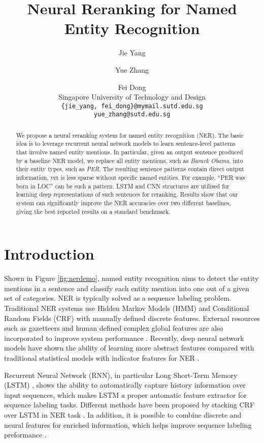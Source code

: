 \documentclass[11pt,a4paper]{article}
\title{Neural Reranking for Named Entity Recognition}
\author{Jie Yang \and Yue Zhang \and Fei Dong\\ 
  Singapore University of Technology and Design \\
  {\tt \{jie\_yang, fei\_dong\}@mymail.sutd.edu.sg} \\
  {\tt yue\_zhang@sutd.edu.sg} \\}
\date{}
\begin{document}
\maketitle
\begin{abstract}
  We propose a neural reranking system for named entity recognition (NER). The basic idea is to leverage recurrent neural network models to learn sentence-level patterns that involve named entity mentions. In particular, given an output sentence produced by a baseline NER model, we replace all entity mentions, such as \textit{Barack Obama}, into their entity types, such as \textit{PER}. The resulting sentence patterns contain direct output information, yet is less sparse without specific named entities. For example, ``PER was born in LOC'' can be such a pattern. LSTM and CNN structures are utilised for learning deep representations of such sentences for reranking. Results show that our system can significantly improve the NER accuracies over two different baselines, giving the best reported results on a standard benchmark.
\end{abstract}


\section{Introduction}

Shown in Figure \ref{fig:nerdemo}, named entity recognition aims to detect the entity mentions in a sentence and classify each entity mention into one out of a given set of categories. NER is typically solved as a sequence labeling problem. Traditional NER systems use Hidden Markov Models (HMM) \cite{zhou2002named} and Conditional Random Fields (CRF) \cite{lafferty2001conditional} with manually defined discrete features. External resources such as gazetteers and human defined complex global features are also incorporated to improve system performance \cite{ratinov2009design,che2013named}. Recently, deep neural network models have shown the ability of learning more abstract features compared with traditional statistical models with indicator features for NER \cite{zhang2015neural}.

Recurrent Neural Network (RNN), in particular Long Short-Term Memory (LSTM) \cite{hochreiter1997long}, shows the ability to automatically capture history information over input sequences, which makes LSTM a proper automatic feature extractor for sequence labeling tasks. Different methods have been proposed by stacking CRF over LSTM in NER task \cite{chiu2015named,huang2015bidirectional,lample2016neural,ma2016end}. In addition, it is possible to combine discrete and neural features for enriched information, which helps improve sequence labeling preformance \cite{zhang2016libn3l}.
\end{document}
